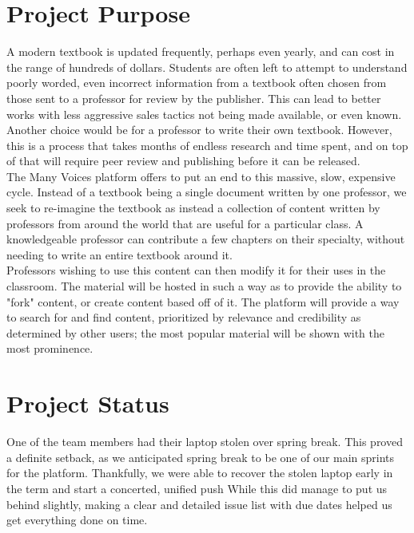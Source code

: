 \documentclass[onecolumn, draftclsnofoot,10pt, compsoc]{IEEEtran}
\begin{document}

\section{Project Purpose}
\noindent A modern textbook is updated frequently, perhaps even yearly,
and can cost in the range of hundreds of dollars. Students are often left
to attempt to understand poorly worded, even incorrect information from a textbook
often chosen from those sent to a professor for review by the publisher.
This can lead to better works with less aggressive sales tactics not being
made available, or even known.
Another choice would be for a professor to write their own textbook.
However, this is a process that takes months of endless research and
time spent, and on top of that will require peer review and publishing
before it can be released. \\

\noindent The Many Voices platform offers to put an end to this massive,
slow, expensive cycle.  Instead of a textbook being a single document
written by one professor, we seek to re-imagine the textbook as instead
a collection of content written by professors from around the world
that are useful for a particular class. A knowledgeable professor can
contribute a few chapters on their specialty, without needing to write
an entire textbook around it. \\

\noindent Professors wishing to use this content can then modify it for
their uses in the classroom. The material will be hosted in such a way
as to provide the ability to "fork" content, or create content based
off of it. The platform will provide a way to search for and find content,
prioritized by relevance and credibility as determined by other users;
the most popular material will be shown with the most prominence.

\newpage

\section{Project Status}

\noindent
One of the team members had their laptop stolen over spring break. This proved a definite setback,
as we anticipated spring break to be one of our main sprints for the platform. Thankfully,
we were able to recover the stolen laptop early in the term and start a concerted, unified push
While this did manage to put us behind slightly, making a clear and detailed issue list
with due dates helped us get everything done on time. \\
\end{document}
